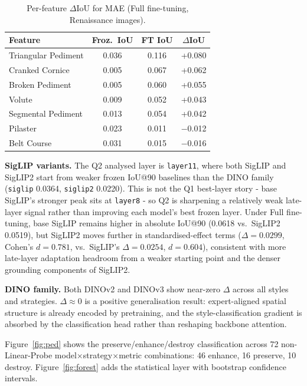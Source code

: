\documentclass[lineno,pdflatex,sn-mathphys-num]{sn-jnl}%
\theoremstyle{thmstyleone}%
\theoremstyle{thmstyletwo}%
\theoremstyle{thmstylethree}%
\begin{document}
\begin{table}[h]
\centering
\caption{Per-feature $\Delta$IoU for MAE (Full fine-tuning, Renaissance images).}
\label{tab:mae_renaissance}
\begin{tabular}{lccc}
\toprule
Feature & Froz.\ IoU & FT IoU & $\Delta$IoU \\
\midrule
Triangular Pediment & 0.036 & 0.116 & +0.080 \\
Cranked Cornice     & 0.005 & 0.067 & +0.062 \\
Broken Pediment     & 0.005 & 0.060 & +0.055 \\
Volute              & 0.009 & 0.052 & +0.043 \\
Segmental Pediment  & 0.013 & 0.054 & +0.042 \\
Pilaster            & 0.023 & 0.011 & $-$0.012 \\
Belt Course         & 0.031 & 0.015 & $-$0.016 \\
\bottomrule
\end{tabular}
\end{table}

\textbf{SigLIP variants.} The Q2 analysed layer is \texttt{layer11}, where
both SigLIP and SigLIP2 start from weaker frozen IoU@90 baselines than the
DINO family (\texttt{siglip} 0.0364, \texttt{siglip2} 0.0220). This is not
the Q1 best-layer story - base SigLIP's stronger peak sits at \texttt{layer8}
- so Q2 is sharpening a relatively weak late-layer signal rather than
improving each model's best frozen layer. Under Full fine-tuning, base SigLIP
remains higher in absolute IoU@90 (0.0618 vs.\ SigLIP2 0.0519), but SigLIP2
moves further in standardised-effect terms ($\Delta\!=\!0.0299$, Cohen's
$d\!=\!0.781$, vs.\ SigLIP's $\Delta\!=\!0.0254$, $d\!=\!0.604$), consistent
with more late-layer adaptation headroom from a weaker starting point and the
denser grounding components of SigLIP2.

\textbf{DINO family.} Both DINOv2 and DINOv3 show near-zero $\Delta$ across all
styles and strategies. $\Delta\!\approx\!0$ is a positive generalisation result:
expert-aligned spatial structure is already encoded by pretraining, and the
style-classification gradient is absorbed by the classification head rather than
reshaping backbone attention.

Figure~\ref{fig:ped} shows the preserve/enhance/destroy classification across
72 non-Linear-Probe model$\times$strategy$\times$metric combinations: 46 enhance,
16 preserve, 10 destroy. Figure~\ref{fig:forest} adds the statistical layer with
bootstrap confidence intervals.
\end{document}
